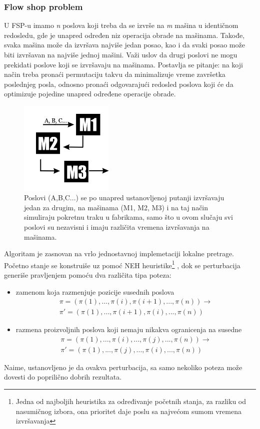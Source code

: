 \documentclass[a4paper]{article}
\begin{document}
\subsubsection{Flow shop problem}
U FSP-u imamo \textit{n} poslova koji treba da se izvrše na \textit{m} mašina u identičnom redosledu, gde je unapred određen niz operacija obrade na mašinama. Takođe, svaka mašina može da izvršava najviše jedan posao, kao i da svaki posao može biti izvršavan na najviše jednoj mašini. Važi uslov da drugi poslovi ne mogu prekidati poslove koji se izvršavaju na mašinama.  Postavlja se pitanje: na koji način treba pronaći permutaciju takvu da minimalizuje
vreme završetka poslednjeg posla, odnosno pronaći odgovarajući redosled poslova koji će da optimizuje pojedine unapred određene operacije obrade.\cite{handbookOfMetaheuristics}
\begin{figure}[h!]
  \centering
  \includegraphics[width=0.4\textwidth]{flowshop.png}
  \caption{Poslovi (A,B,C...) se po unapred ustanovljenoj putanji izvršavaju jedan za drugim, na mašinama (M1, M2, M3) i na taj način simuliraju pokretnu traku u fabrikama, samo što u ovom slučaju svi poslovi su nezavisni i imaju različita vremena izvršavanja na mašinama. }
  \label{figure:fsp}
\end{figure}

Algoritam je zasnovan na vrlo jednostavnoj implemetaciji lokalne pretrage. Početno stanje se konstruiše uz pomoć NEH heuristike\footnote{Jedna od najboljih heuristika za određivanje početnih stanja, za razliku od nasumičnog izbora, ona prioritet daje poslu sa najvećom sumom vremena izvršavanja }
, dok se perturbacija generiše pravljenjem pomoću dva različita tipa poteza:
\begin{itemize}
  \item zamenom koja razmenjuje pozicije susednih poslova \\
	\begin{gather*}
	 \pi = (\pi(1),..., \pi(i), \pi(i+1),..., \pi(n)) \rightarrow \\\pi\prime =  ( \pi(1),...,  \pi(i+1),  \pi(i),...,  \pi(n))
  \end{gather*}
  \item razmena proizvoljnih poslova koji nemaju nikakva ogranicenja na susedne \\
	\begin{gather*}
	 \pi = (\pi(1),..., \pi(i),..., \pi(j),..., \pi(n)) \rightarrow \\\pi\prime =  ( \pi(1),...,  \pi(j),...,  \pi(i),...,  \pi(n))
	\end{gather*}
\end{itemize}
Naime, ustanovljeno je da ovakva perturbacija, sa samo nekoliko poteza može dovesti do poprilično dobrih rezultata.
\end{document}
